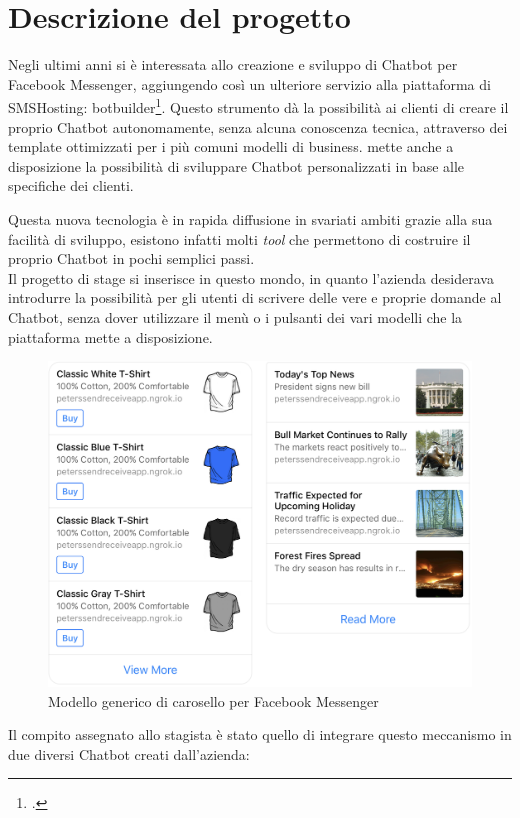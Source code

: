 \section{Descrizione del progetto}
Negli ultimi anni \azienda{} si è interessata allo creazione e sviluppo di \gls{Chatbot} per Facebook Messenger, aggiungendo così un ulteriore servizio alla piattaforma di SMSHosting: botbuilder\footcite{botbuilder}. Questo strumento dà la possibilità ai clienti di creare il proprio \gls{Chatbot} autonomamente, senza alcuna conoscenza tecnica, attraverso dei template ottimizzati per i più comuni modelli di business. \azienda{} mette anche a disposizione la possibilità di sviluppare \gls{Chatbot} personalizzati in base alle specifiche dei clienti. 

Questa nuova tecnologia è in rapida diffusione in svariati ambiti grazie alla sua facilità di sviluppo, esistono infatti molti \emph{tool} che permettono di costruire il proprio \gls{Chatbot} in pochi semplici passi.\\
Il progetto di stage si inserisce in questo mondo, in quanto l'azienda desiderava introdurre la possibilità per gli utenti di scrivere delle vere e proprie domande al \gls{Chatbot}, senza dover utilizzare il menù o i pulsanti dei vari modelli che la piattaforma mette a disposizione.
\begin{figure}[h]
	\centering
	\includegraphics[scale=0.2]{../Immagini/modello_lista.png}
	\caption{Modello generico di carosello per Facebook Messenger}
\end{figure}
\newpage
Il compito assegnato allo stagista è stato quello di integrare questo meccanismo in due diversi \gls{Chatbot} creati dall'azienda:
